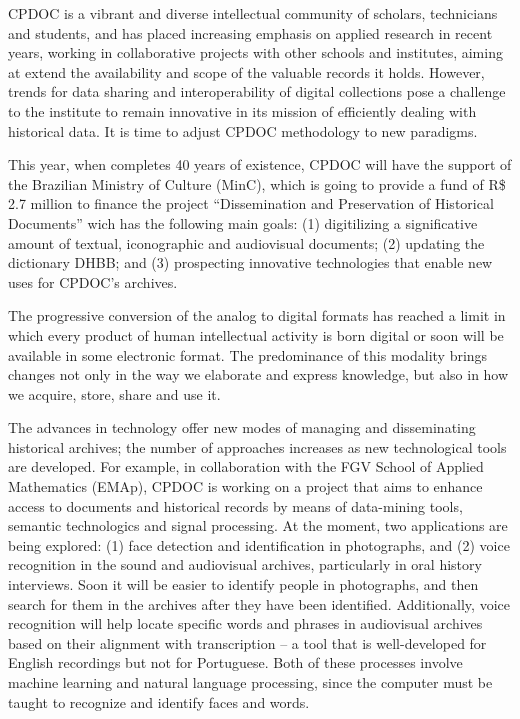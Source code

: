 CPDOC is a vibrant and diverse intellectual community of scholars,
technicians and students, and has placed increasing emphasis on
applied research in recent years, working in collaborative projects
with other schools and institutes, aiming at extend the availability
and scope of the valuable records it holds. However, trends for data
sharing and interoperability of digital collections pose a challenge
to the institute to remain innovative in its mission of efficiently
dealing with historical data. It is time to adjust CPDOC methodology
to new paradigms.

This year, when completes 40 years of existence, CPDOC will have the
support of the Brazilian Ministry of Culture (MinC), which is going to
provide a fund of R\$ 2.7 million to finance the project
``Dissemination and Preservation of Historical Documents'' wich has
the following main goals: (1) digitilizing a significative amount of
textual, iconographic and audiovisual documents; (2) updating the
dictionary DHBB; and (3) prospecting innovative technologies that
enable new uses for CPDOC's archives.
   
The progressive conversion of the analog to digital formats has
reached a limit in which every product of human intellectual activity
is born digital or soon will be available in some electronic
format. The predominance of this modality brings changes not only in
the way we elaborate and express knowledge, but also in how we
acquire, store, share and use it.
   
The advances in technology offer new modes of managing and
disseminating historical archives; the number of approaches increases
as new technological tools are developed. For example, in
collaboration with the FGV School of Applied Mathematics (EMAp), CPDOC
is working on a project that aims to enhance access to documents and
historical records by means of data-mining tools, semantic
technologics and signal processing. At the moment, two applications
are being explored: (1) face detection and identification in
photographs, and (2) voice recognition in the sound and audiovisual
archives, particularly in oral history interviews. Soon it will be
easier to identify people in photographs, and then search for them in
the archives after they have been identified. Additionally, voice
recognition will help locate specific words and phrases in audiovisual
archives based on their alignment with transcription -- a tool that is
well-developed for English recordings but not for Portuguese. Both of
these processes involve machine learning and natural language
processing, since the computer must be taught to recognize and
identify faces and words.
   
